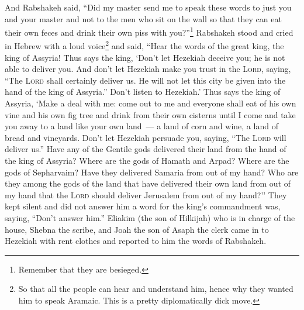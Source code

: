 \begin{inparaenum}
     And Rabshakeh said, ``Did my master send me to speak these words to just you and your master and not to the men who sit on the wall so that they can eat their own feces and drink their own piss with you?''\footnote{Remember that they are besieged.}%
     Rabshakeh stood and cried in Hebrew with a loud voice\footnote{So that all the people can hear and understand him, hence why they wanted him to speak Aramaic. This is a pretty diplomatically dick move.} and said, ``Hear the words of the great king, the king of Assyria!%
     Thus says the king, `Don't let Hezekiah deceive you; he is not able to deliver you.%
     And don't let Hezekiah make you trust in the \textsc{Lord}, saying, ``The \textsc{Lord} shall certainly deliver us. He will not let this city be given into the hand of the king of Assyria.''%
     Don't listen to Hezekiah.' Thus says the king of Assyria, `Make a deal with me: come out to me and everyone shall eat of his own vine and his own fig tree and drink from their own cisterns%
     until I come and take you away to a land like your own land~--- a land of corn and wine, a land of bread and vineyards.%
     Don't let Hezekiah persuade you, saying, ``The \textsc{Lord} will deliver us.'' Have any of the Gentile gods delivered their land from the hand of the king of Assyria?%
     Where are the gods of Hamath and Arpad? Where are the gods of Sepharvaim? Have they delivered Samaria from out of my hand?%
     Who are they among the gods of the land that have delivered their own land from out of my hand that the \textsc{Lord} should deliver Jerusalem from out of my hand?''%
     They kept silent and did not answer him a word for the king's commandment was, saying, ``Don't answer him.''%
     Eliakim (the son of Hilkijah) who is in charge of the house, Shebna the scribe, and Joah the son of Asaph the clerk came in to Hezekiah with rent clothes and reported to him the words of Rabshakeh.%
\end{inparaenum}
